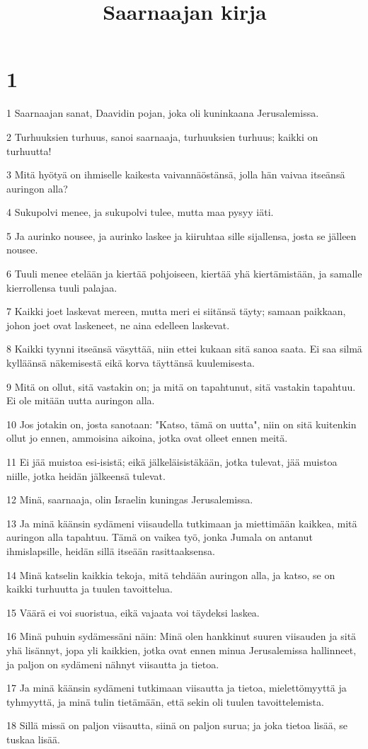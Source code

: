 

\title{Saarnaajan kirja}


\chapter{1}

\par 1 Saarnaajan sanat, Daavidin pojan, joka oli kuninkaana Jerusalemissa.
\par 2 Turhuuksien turhuus, sanoi saarnaaja, turhuuksien turhuus; kaikki on turhuutta!
\par 3 Mitä hyötyä on ihmiselle kaikesta vaivannäöstänsä, jolla hän vaivaa itseänsä auringon alla?
\par 4 Sukupolvi menee, ja sukupolvi tulee, mutta maa pysyy iäti.
\par 5 Ja aurinko nousee, ja aurinko laskee ja kiiruhtaa sille sijallensa, josta se jälleen nousee.
\par 6 Tuuli menee etelään ja kiertää pohjoiseen, kiertää yhä kiertämistään, ja samalle kierrollensa tuuli palajaa.
\par 7 Kaikki joet laskevat mereen, mutta meri ei siitänsä täyty; samaan paikkaan, johon joet ovat laskeneet, ne aina edelleen laskevat.
\par 8 Kaikki tyynni itseänsä väsyttää, niin ettei kukaan sitä sanoa saata. Ei saa silmä kylläänsä näkemisestä eikä korva täyttänsä kuulemisesta.
\par 9 Mitä on ollut, sitä vastakin on; ja mitä on tapahtunut, sitä vastakin tapahtuu. Ei ole mitään uutta auringon alla.
\par 10 Jos jotakin on, josta sanotaan: "Katso, tämä on uutta", niin on sitä kuitenkin ollut jo ennen, ammoisina aikoina, jotka ovat olleet ennen meitä.
\par 11 Ei jää muistoa esi-isistä; eikä jälkeläisistäkään, jotka tulevat, jää muistoa niille, jotka heidän jälkeensä tulevat.
\par 12 Minä, saarnaaja, olin Israelin kuningas Jerusalemissa.
\par 13 Ja minä käänsin sydämeni viisaudella tutkimaan ja miettimään kaikkea, mitä auringon alla tapahtuu. Tämä on vaikea työ, jonka Jumala on antanut ihmislapsille, heidän sillä itseään rasittaaksensa.
\par 14 Minä katselin kaikkia tekoja, mitä tehdään auringon alla, ja katso, se on kaikki turhuutta ja tuulen tavoittelua.
\par 15 Väärä ei voi suoristua, eikä vajaata voi täydeksi laskea.
\par 16 Minä puhuin sydämessäni näin: Minä olen hankkinut suuren viisauden ja sitä yhä lisännyt, jopa yli kaikkien, jotka ovat ennen minua Jerusalemissa hallinneet, ja paljon on sydämeni nähnyt viisautta ja tietoa.
\par 17 Ja minä käänsin sydämeni tutkimaan viisautta ja tietoa, mielettömyyttä ja tyhmyyttä, ja minä tulin tietämään, että sekin oli tuulen tavoittelemista.
\par 18 Sillä missä on paljon viisautta, siinä on paljon surua; ja joka tietoa lisää, se tuskaa lisää.

